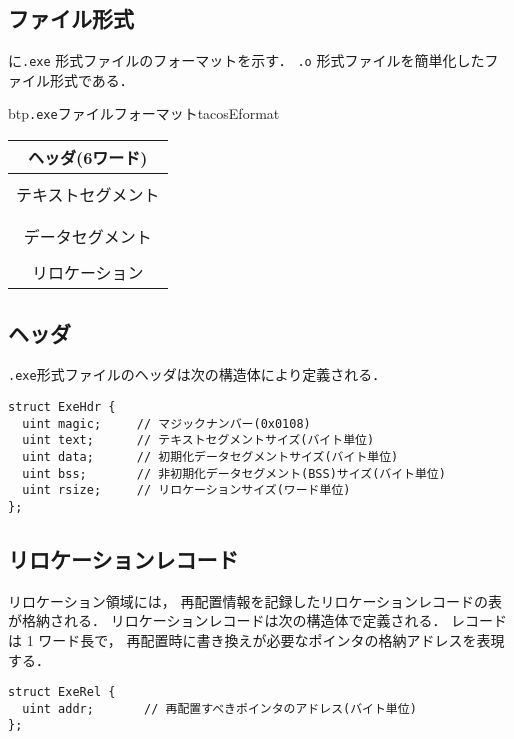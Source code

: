 \subsection{ファイル形式}
に\texttt{.exe} 形式ファイルのフォーマットを示す．
\texttt{.o} 形式ファイルを簡単化したファイル形式である．

\begin{myfig}{btp}{\texttt{.exe}ファイルフォーマット}{tacosEformat}
  \begin{tabular}{|c|} \hline
    ヘッダ(6ワード) \\\hline
    \\
    テキストセグメント \\
    \\\hline
    \\
    データセグメント \\
    \\\hline
    リロケーション \\\hline
  \end{tabular}
\end{myfig}

\subsection{ヘッダ}
\texttt{.exe}形式ファイルのヘッダは次の構造体により定義される．

\begin{lstlisting}[numbers=none,float=htb]
struct ExeHdr {
  uint magic;     // マジックナンバー(0x0108)
  uint text;      // テキストセグメントサイズ(バイト単位)
  uint data;      // 初期化データセグメントサイズ(バイト単位)
  uint bss;       // 非初期化データセグメント(BSS)サイズ(バイト単位)
  uint rsize;     // リロケーションサイズ(ワード単位)
};
\end{lstlisting}

\subsection{リロケーションレコード}
リロケーション領域には，
再配置情報を記録したリロケーションレコードの表が格納される．
リロケーションレコードは次の構造体で定義される．
レコードは 1 ワード長で，
再配置時に書き換えが必要なポインタの格納アドレスを表現する．

\begin{lstlisting}[numbers=none,float=htb]
struct ExeRel {
  uint addr;       // 再配置すべきポインタのアドレス(バイト単位)
};
\end{lstlisting}

